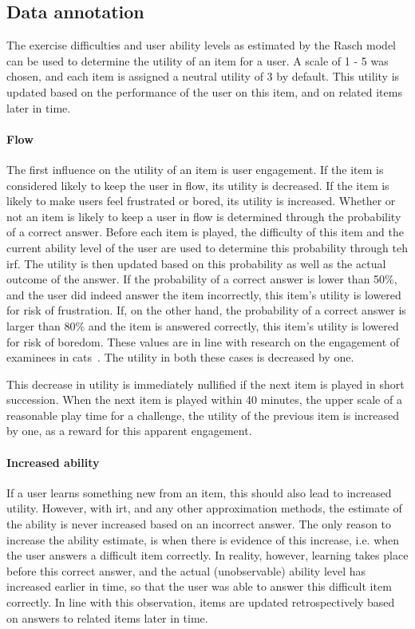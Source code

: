 \subsection{Data annotation}
\label{sec:utility}
The exercise difficulties and user ability levels as estimated by the Rasch model can be used to determine the utility of an item for a user.
A scale of 1 - 5 was chosen, and each item is assigned a neutral utility of 3 by default.
This utility is updated based on the performance of the user on this item, and on related items later in time.

\paragraph{Flow}
The first influence on the utility of an item is user engagement.
If the item is considered likely to keep the user in flow, its utility is decreased.
If the item is likely to make users feel frustrated or bored, its utility is increased.
Whether or not an item is likely to keep a user in flow is determined through the probability of a correct answer.
Before each item is played, the difficulty of this item and the current ability level of the user are used to determine this probability through teh \gls{irf}.
The utility is then updated based on this probability as well as the actual outcome of the answer.
If the probability of a correct answer is lower than 50\%, and the user did indeed answer the item incorrectly, this item's utility is lowered for risk of frustration.
If, on the other hand, the probability of a correct answer is larger than 80\% and the item is answered correctly, this item's utility is lowered for risk of boredom.
These values are in line with research on the engagement of examinees in \glspl{cat}~\cite{ling2017computerized}.
The utility in both these cases is decreased by one.

This decrease in utility is immediately nullified if the next item is played in short succession.
When the next item is played within 40 minutes, the upper scale of a reasonable play time for a challenge, the utility of the previous item is increased by one, as a reward for this apparent engagement.

\paragraph{Increased ability}
If a user learns something new from an item, this should also lead to increased utility.
However, with \gls{irt}, and any other approximation methods, the estimate of the ability is never increased based on an incorrect answer.
The only reason to increase the ability estimate, is when there is evidence of this increase, i.e. when the user answers a difficult item correctly.
In reality, however, learning takes place before this correct answer, and the actual (unobservable) ability level has increased earlier in time, so that the user was able to answer this difficult item correctly.
In line with this observation, items are updated retrospectively based on answers to related items later in time.

